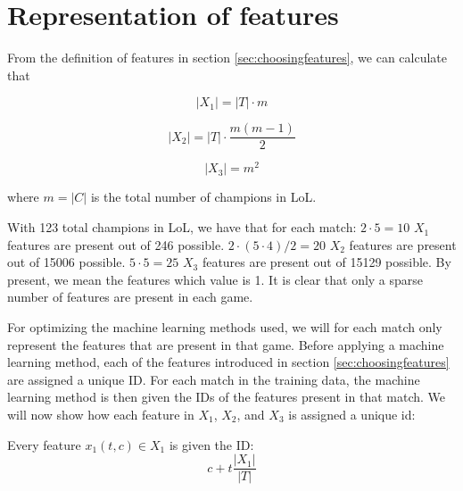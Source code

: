 \section{Representation of features}
\label{sec:representationoffeatures}
From the definition of features in section \ref{sec:choosingfeatures}, we can calculate that

\[|X_1| = |T| \cdot m \]

\[|X_2| = |T| \cdot \frac{m(m-1)}{2} \]

\[|X_3| = m^2  \]

where $m = |C|$ is the total number of champions in LoL.

With 123 total champions in LoL, we have that for each match:
$2 \cdot 5 = 10$ $X_1$ features are present out of 246 possible.
$2 \cdot (5 \cdot 4)/2 = 20$ $X_2$ features are present out of 15006 possible.
$5 \cdot 5 = 25$ $X_3$ features are present out of 15129 possible.
By present, we mean the features which value is 1.
It is clear that only a sparse number of features are present in each game. 

For optimizing the machine learning methods used, we will for each match only represent the features that are present in that game. 
Before applying a machine learning method, each of the features introduced in section \ref{sec:choosingfeatures} are assigned a unique ID.
For each match in the training data, the machine learning method is then given the IDs of the features present in that match.
We will now show how each feature in $X_1$, $X_2$, and $X_3$ is assigned a unique id:

\begin{center}
Every feature $x_1(t, c) \in X_1$ is given the ID:
\[ c + t \frac{|X_1|}{|T|} \]
\end{center}

